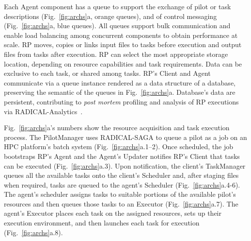 \documentclass[preprint,12pt, a4paper]{elsarticle}
\begin{document}

Each Agent component has a queue to support the exchange of pilot or task
descriptions (Fig.~\ref{fig:archs}a, orange queues), and of control messaging
(Fig.~\ref{fig:archs}a, blue queues). All queues support bulk communication and
enable load balancing among concurrent components to obtain performance at
scale.
%
%
RP moves, copies or links input files to tasks before execution and output files
from tasks after execution. RP can select the most appropriate storage location,
depending on resource capabilities and task requirements. Data can be exclusive
to each task, or shared among tasks.
%
%
RP's Client and Agent communicate via a queue instance rendered as a data
structure of a database, preserving the semantic of the queues in
Fig.~\ref{fig:archs}a. Database's data are persistent, contributing to
\textit{post mortem} profiling and analysis of RP executions via
RADICAL-Analytics~\cite{radical-analytics}.

Fig.~\ref{fig:archs}a's numbers show the resource acquisition and task execution
process. The PilotManager uses RADICAL-SAGA to queue a pilot as a job on an HPC
platform's batch system (Fig.~\ref{fig:archs}a.1--2). Once scheduled, the job
bootstraps RP's Agent and the Agent's Updater notifies RP's Client that tasks
can be executed (Fig.~\ref{fig:archs}a.3). Upon notification, the client's
TaskManager queues all the available tasks onto the client's Scheduler and,
after staging files when required, tasks are queued to the agent's Scheduler
(Fig.~\ref{fig:archs}a.4-6). The agent's scheduler assigns tasks to suitable
portions of the available pilot's resources and then queues those tasks to an
Executor (Fig.~\ref{fig:archs}a.7). The agent's Executor places each task on the
assigned resources, sets up their execution environment, and then launches each
task for execution (Fig.~\ref{fig:archs}a.8).
\end{document}
